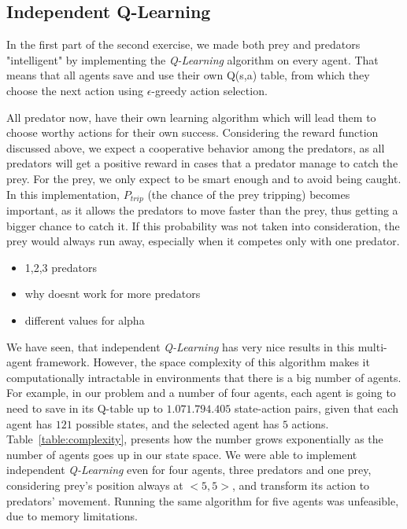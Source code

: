\documentclass[a4paper,11pt]{article}
\begin{document}
\subsection{Independent Q-Learning}
In the first part of the second exercise, we made both prey and predators "intelligent" by implementing the \textit{Q-Learning} algorithm on every agent. That means that all agents save and use their own Q(s,a) table, from which they choose the next action using $\epsilon$-greedy action selection.

All predator now, have their own learning algorithm which will lead them to choose worthy actions for their own success. Considering the reward function discussed above, we expect a cooperative behavior among the predators, as all predators will get a positive reward in cases that a predator manage to catch the prey. For the prey, we only expect to be smart enough and to avoid being caught. In this implementation, $P_{trip}$ (the chance of the prey tripping) becomes important, as it allows the predators to move faster than the prey, thus getting a bigger chance to catch it. If this probability was not taken into consideration, the prey would always run away, especially when it competes only with one predator.

\begin{itemize}
\item 1,2,3 predators
\item why doesnt work for more predators
\item different values for alpha
\end{itemize}

We have seen, that independent \textit{Q-Learning} has very nice results in this multi-agent framework. However, the space complexity of this algorithm makes it computationally intractable in environments that there is a big number of agents. For example, in our problem and a number of four agents, each agent is going to need to save in its Q-table up to $1.071.794.405$ state-action pairs, given that each agent has $121$ possible states, and the selected agent has $5$ actions. Table~\ref{table:complexity}, presents how the number grows exponentially as the number of agents goes up in our state space. We were able to implement independent \textit{Q-Learning} even for four agents, three predators and one prey, considering prey's position always at $<5,5>$, and transform its action to predators' movement. Running the same algorithm for five agents was unfeasible, due to memory limitations.
\end{document}
